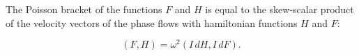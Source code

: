 The Poisson bracket of the functions $F$ and $H$ is equal to the skew-scalar product of the velocity vectors of the phase flows with hamiltonian functions $H$ and $F$:

$$(F, H) = \omega^2(I\, dH, I\, dF).$$
